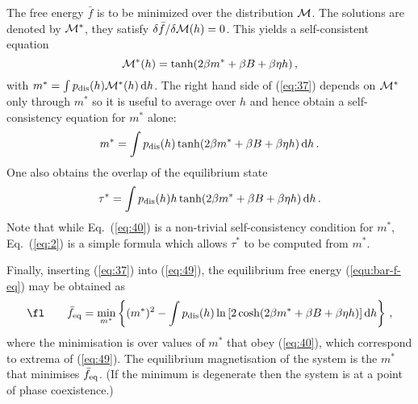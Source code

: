 \documentclass{iopart}
\newcommand{\eqref}[1]{(\ref{#1})}
\begin{document}
The free energy $\bar f$ is to be minimized over the distribution ${\cal M}$.
The solutions are denoted by ${\cal M}^{\ast}$, they satisfy $\delta \bar{f}/\delta {\cal M}(h) = 0$. This yields a self-consistent equation
\begin{equation}
  \label{eq:37}
 {\cal M}^{\ast}(h) = \tanh(2\beta m^{\ast} + \beta B + \beta \eta h) \, ,
\end{equation}
with $m^{\ast} = \int p_{\rm dis}(h) {\cal M}^{\ast}(h) \, \mathrm{d}h$.
The right hand side of \eqref{eq:37} depends on ${\cal M}^{\ast}$ only through $m^{\ast}$ so it is useful to
average over $h$ and hence obtain a self-consistency equation for $m^{\ast}$ alone:
\begin{equation}
  \label{eq:40}
  m^{\ast} = \int p_{\rm dis}(h) \tanh(2\beta m^{\ast} + \beta B + \beta \eta h) \, {\rm d}h \, .
\end{equation}
One also obtains the overlap of the equilibrium state
\begin{equation}
  \label{eq:2}
  \tau^{\ast} = \int p_{\rm dis}(h) h \tanh(2\beta m^{\ast} + \beta B + \beta \eta h) \, \mathrm{d}h \, .
\end{equation}
Note that while Eq.\ \eqref{eq:40} is a non-trivial self-consistency condition for $m^\ast$,  Eq.~\eqref{eq:2} is a simple formula which allows $\tau^\ast$ to be computed from $m^\ast$.

Finally, inserting \eqref{eq:37} into \eqref{eq:49}, the equilibrium free energy (\ref{equ:bar-f-eq}) may be obtained as
\begin{equation}
  \label{eq:39}
  \fl \qquad
  \bar{f}_{\rm eq} 
= %
\min_{m^{\ast}} \left\{ (m^{\ast})^{2} - \int \pdis(h)\ln\left[ 2 \cosh(2\beta m^{\ast} + \beta B + \beta \eta h) \right] \mathrm{d}h \right\} \, ,
\end{equation}
where the minimisation is over values of 
$m^{\ast}$ that obey (\ref{eq:40}), which correspond to extrema of (\ref{eq:49}).
The equilibrium magnetisation of the system is the $m^{\ast}$ that minimises $\bar{f}_{\rm eq}$.  (If the minimum is degenerate then the system is at a point of phase coexistence.)
\end{document}
